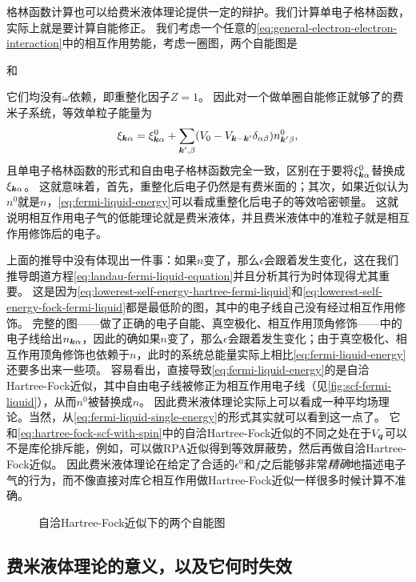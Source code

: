 格林函数计算也可以给费米液体理论提供一定的辩护。我们计算单电子格林函数，实际上就是要计算自能修正。
我们考虑一个任意的\eqref{eq:general-electron-electron-interaction}中的相互作用势能，考虑一圈图，两个自能图是

和

它们均没有$\omega$依赖，即重整化因子$Z=1$。
因此对一个做单圈自能修正就够了的费米子系统，等效单粒子能量为
\begin{equation}
    \xi_{\vb*{k} \alpha} = \xi^0_{\vb*{k} \alpha} + \sum_{\vb*{k}', \beta} (V_0 - V_{\vb*{k} - \vb*{k}'} \delta_{\alpha \beta}) n_{\vb*{k}' \beta}^0,
\end{equation}
且单电子格林函数的形式和自由电子格林函数完全一致，区别在于要将$\xi^0_{\vb*{k} \alpha}$替换成$\xi_{\vb*{k} \alpha}$。
这就意味着，首先，重整化后电子仍然是有费米面的；其次，如果近似认为$n^0$就是$n$，\eqref{eq:fermi-liquid-energy}可以看成重整化后电子的等效哈密顿量。
这就说明相互作用电子气的低能理论就是费米液体，并且费米液体中的准粒子就是相互作用修饰后的电子。

上面的推导中没有体现出一件事：如果$n$变了，那么$\epsilon$会跟着发生变化，这在我们推导朗道方程\eqref{eq:landau-fermi-liquid-equation}并且分析其行为时体现得尤其重要。
这是因为\eqref{eq:lowerest-self-energy-hartree-fermi-liquid}和\eqref{eq:lowerest-self-energy-fock-fermi-liquid}都是最低阶的图，其中的电子线自己没有经过相互作用修饰。
完整的图——做了正确的电子自能、真空极化、相互作用顶角修饰——中的电子线给出$n_{\vb*{k} \alpha}$，因此的确如果$n$变了，那么$\epsilon$会跟着发生变化；由于真空极化、相互作用顶角修饰也依赖于$n$，此时的系统总能量实际上相比\eqref{eq:fermi-liquid-energy}还要多出来一些项。
容易看出，直接导致\eqref{eq:fermi-liquid-energy}的是自洽Hartree-Fock近似，其中自由电子线被修正为相互作用电子线（见\autoref{fig:scf-fermi-liquid}），从而$n^0$被替换成$n$。
因此费米液体理论实际上可以看成一种平均场理论。当然，从\eqref{eq:fermi-liquid-single-energy}的形式其实就可以看到这一点了。
它和\eqref{eq:hartree-fock-scf-with-spin}中的自洽Hartree-Fock近似的不同之处在于$V_{\vb*{q}}$可以不是库伦排斥能，例如，可以做RPA近似得到等效屏蔽势，然后再做自洽Hartree-Fock近似。
因此费米液体理论在给定了合适的$\epsilon^0$和$f$之后能够非常\emph{精确}地描述电子气的行为，而不像直接对库仑相互作用做Hartree-Fock近似一样很多时候计算不准确。

\begin{figure}
    \centering
    
    \caption{自洽Hartree-Fock近似下的两个自能图}
    \label{fig:scf-fermi-liquid}
\end{figure}

\subsection{费米液体理论的意义，以及它何时失效}

